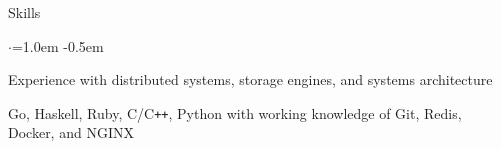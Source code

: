 \documentclass{resume} %
\begin{document}

\begin{rSection}{Skills}
  \vspace {0.5em}
  \begin{list}{$\cdot$}{\leftmargin=1.0em}
    \itemsep -0.5em \vspace{-0.5em}
    \item Experience with distributed systems, storage engines, and systems architecture
    \item Go, Haskell, Ruby, C/C\texttt{++}, Python with working knowledge of
      Git, Redis, Docker, and NGINX
  \end{list}
  \vspace{0.5em}
\end{rSection}

\end{document}
